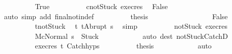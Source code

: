 \begin{isabellebody}
\ \ \ \ \ \ \ \ \isamarkupfalse%
\ True\isanewline
\ \ \ \ \ \ \ \ \isamarkupfalse%
\ c{}{\isacharunderscore}notStuck\ exec{\isacharunderscore}res\ \isamarkupfalse%
\ {\isachardoublequoteopen}False{\isachardoublequoteclose}\isanewline
\ \ \ \ \ \ \ \ \ \ \isamarkupfalse%
\ {\isacharparenleft}auto\ simp\ add{\isacharcolon}\ final{\isacharunderscore}notin{\isacharunderscore}def{\isacharparenright}\isanewline
\ \ \ \ \ \ \ \ \isamarkupfalse%
\ {\isacharquery}thesis\ \isacommand{{\isachardot}{\isachardot}}\isamarkupfalse%
\isanewline
\ \ \ \ \ \ \isamarkupfalse%
\isanewline
\ \ \ \ \ \ \ \ \isamarkupfalse%
\ False\isanewline
\ \ \ \ \ \ \ \ \isamarkupfalse%
\ t{\isacharprime}{\isacharunderscore}notStuck\ \isamarkupfalse%
\ t{\isacharprime}{\isacharcolon}\ {\isachardoublequoteopen}t{\isacharprime}{\isacharequal}Abrupt\ s{\isacharprime}{\isachardoublequoteclose}\ \isamarkupfalse%
\ simp\isanewline
\ \ \ \ \ \ \ \ \isamarkupfalse%
\ not{\isacharunderscore}Stuck\ exec{\isacharunderscore}res\isanewline
\ \ \ \ \ \ \ \ \isamarkupfalse%
\ {\isachardoublequoteopen}{\isasymGamma}{\isacharbar}\isactrlbsub M\isactrlesub {\isasymturnstile}{\isasymlangle}c{}{\isacharcomma}Normal\ s{\isacharprime}\ {\isasymrangle}\ {\isasymRightarrow}{\isasymnotin}{\isacharbraceleft}Stuck{\isacharbraceright}{\isachardoublequoteclose}\isanewline
\ \ \ \ \ \ \ \ \ \ \isamarkupfalse%
\ {\isacharparenleft}auto\ dest{\isacharcolon}\ notStuck{\isacharunderscore}CatchD{}{\isacharparenright}\ \isanewline
\ \ \ \ \ \ \ \ \isamarkupfalse%
\ exec{\isacharunderscore}res\ t{\isacharprime}\ Catch{\isachardot}hyps\isanewline
\ \ \ \ \ \ \ \ \isamarkupfalse%
\ {\isacharquery}thesis\isanewline
\ \ \ \ \ \ \ \ \ \ \isamarkupfalse%
\ auto\isanewline
\ \ \ \ \ \ \isamarkupfalse%
\isanewline
\ \ \ \ \isamarkupfalse%
\isanewline
\ \ \isamarkupfalse%
\isanewline
{}\isamarkupfalse%
%
\endisatagproof
{\isafoldproof}%
%
\isadelimproof
\isanewline
%
\endisadelimproof
%
\isadelimtheory
\isanewline
%
\endisadelimtheory
%
\isatagtheory
{}\isamarkupfalse%
%
\endisatagtheory
{\isafoldtheory}%
%
\isadelimtheory
%
\endisadelimtheory
%
\end{isabellebody}%
